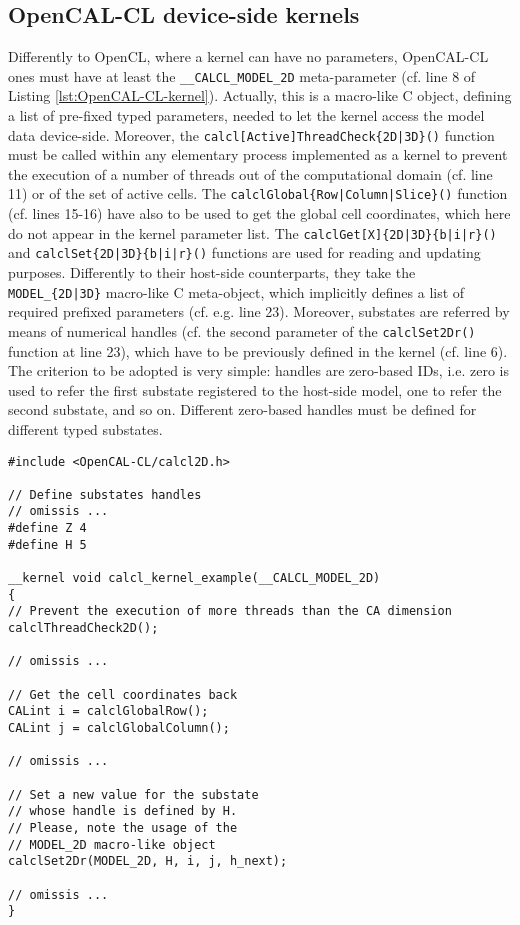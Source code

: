 \subsection{OpenCAL-CL device-side kernels}
Differently to OpenCL, where a kernel can have no parameters,
OpenCAL-CL ones must have at least the \verb'__CALCL_MODEL_2D'
meta-parameter (cf. line 8 of Listing
\ref{lst:OpenCAL-CL-kernel}). Actually, this is a macro-like C
object, defining a list of pre-fixed typed parameters, needed to
let the kernel access the model data device-side. Moreover, the
\verb'calcl[Active]ThreadCheck{2D|3D}()' function must be called
within any elementary process implemented as a kernel to prevent
the execution of a number of threads out of the computational
domain (cf. line 11) or of the set of active cells. The
\verb'calclGlobal{Row|Column|Slice}()' function (cf. lines 15-16)
have also to be used to get the global cell coordinates, which
here do not appear in the kernel parameter list. The
\verb'calclGet[X]{2D|3D}{b|i|r}()' and
\verb'calclSet{2D|3D}{b|i|r}()' functions are used for reading and
updating purposes. Differently to their host-side counterparts,
they take the \verb'MODEL_{2D|3D}' macro-like C meta-object, which
implicitly defines a list of required prefixed parameters
(cf. e.g. line 23). Moreover, substates are referred by means of
numerical handles (cf. the second parameter of the
\verb'calclSet2Dr()' function at line 23), which have to be
previously defined in the kernel (cf. line 6). The criterion to be
adopted is very simple: handles are zero-based IDs, i.e. zero is
used to refer the first substate registered to the host-side
model, one to refer the second substate, and so on. Different
zero-based handles must be defined for different typed substates.

\begin{lstlisting}
#include <OpenCAL-CL/calcl2D.h>

// Define substates handles
// omissis ... 
#define Z 4
#define H 5

__kernel void calcl_kernel_example(__CALCL_MODEL_2D)
{
// Prevent the execution of more threads than the CA dimension
calclThreadCheck2D();

// omissis ...

// Get the cell coordinates back
CALint i = calclGlobalRow();
CALint j = calclGlobalColumn();

// omissis ...

// Set a new value for the substate
// whose handle is defined by H.
// Please, note the usage of the
// MODEL_2D macro-like object
calclSet2Dr(MODEL_2D, H, i, j, h_next);

// omissis ...
}
\end{lstlisting}

